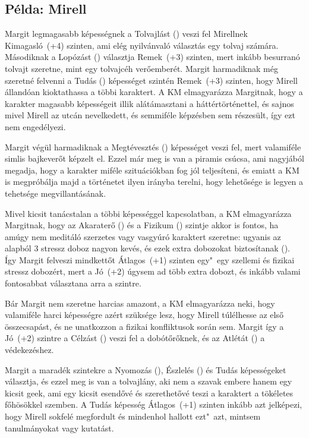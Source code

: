 \subsection[Mirell]{Példa: Mirell}

Margit legmagasabb képességnek a Tolvajlást () veszi fel Mirellnek Kimagasló~(+4) szinten, ami elég nyilvánvaló választás egy tolvaj számára. Másodiknak a Lopózást () választja Remek~(+3) szinten, mert inkább besurranó tolvajt szeretne, mint egy tolvajcéh verőemberét. Margit harmadiknak még szeretné felvenni a Tudás () képességet szintén Remek~(+3) szinten, hogy Mirell állandóan kioktathassa a többi karaktert. A KM elmagyarázza Margitnak, hogy a karakter magasabb képességeit illik alátámasztani a háttértörténettel, és sajnos mivel Mirell az utcán nevelkedett, és semmiféle képzésben sem részesült, így ezt nem engedélyezi.

Margit végül harmadiknak a Megtévesztés () képességet veszi fel, mert valamiféle simlis bajkeverőt képzelt el. Ezzel már meg is van a piramis csúcsa, ami nagyjából megadja, hogy a karakter miféle szituációkban fog jól teljesíteni, és emiatt a KM is megpróbálja majd a történetet ilyen irányba terelni, hogy lehetősége is legyen a tehetsége megvillantásának.

Mivel kicsit tanácstalan a többi képességgel kapcsolatban, a KM elmagyarázza Margitnak, hogy az Akaraterő () és a Fizikum () szintje akkor is fontos, ha amúgy nem meditáló szerzetes vagy vasgyúró karaktert szeretne: ugyanis az alapból 3 stressz doboz nagyon kevés, és ezek extra dobozokat biztosítanak (). Így Margit felveszi mindkettőt Átlagos~(+1) szinten egy"~egy szellemi és fizikai stressz dobozért, mert a Jó~(+2) úgysem ad több extra dobozt, és inkább valami fontosabbat választana arra a szintre.

Bár Margit nem szeretne harcias amazont, a KM elmagyarázza neki, hogy valamiféle harci képességre azért szüksége lesz, hogy Mirell túlélhesse az első összecsapást, és ne unatkozzon a fizikai konfliktusok során sem. Margit így a Jó~(+2) szintre a Célzást () veszi fel a dobótőrőknek, és az Atlétát () a védekezéshez.

Margit a maradék szintekre a Nyomozás (), Észlelés () és Tudás képességeket választja, és ezzel meg is van a tolvajlány, aki nem a szavak embere hanem egy kicsit geek, ami egy kicsit esendővé és szerethetővé teszi a karaktert a tökéletes főhösökkel szemben. A Tudás képesség Átlagos~(+1) szinten inkább azt jelképezi, hogy Mirell sokfelé megfordult és mindenhol hallott ezt"~azt, mintsem tanulmányokat vagy kutatást.


